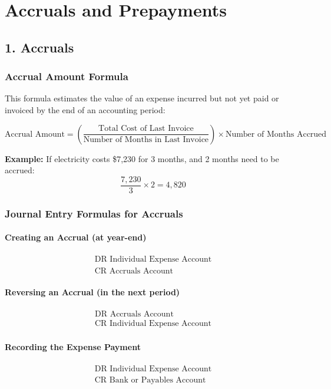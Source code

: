 \section*{Accruals and Prepayments}

\subsection*{1. Accruals}

\subsubsection*{Accrual Amount Formula}

This formula estimates the value of an expense incurred but not yet paid or invoiced by the end of an accounting period:

\[
\text{Accrual Amount} = \left( \frac{\text{Total Cost of Last Invoice}}{\text{Number of Months in Last Invoice}} \right) \times \text{Number of Months Accrued}
\]

\textbf{Example:}  
If electricity costs \$7,230 for 3 months, and 2 months need to be accrued:  
\[
\frac{7,230}{3} \times 2 = 4,820
\]

\subsubsection*{Journal Entry Formulas for Accruals}

\paragraph{Creating an Accrual (at year-end)}  
\[
\begin{aligned}
\text{DR Individual Expense Account} \\
\text{CR Accruals Account}
\end{aligned}
\]

\paragraph{Reversing an Accrual (in the next period)}  
\[
\begin{aligned}
\text{DR Accruals Account} \\
\text{CR Individual Expense Account}
\end{aligned}
\]

\paragraph{Recording the Expense Payment}  
\[
\begin{aligned}
\text{DR Individual Expense Account} \\
\text{CR Bank or Payables Account}
\end{aligned}
\]

